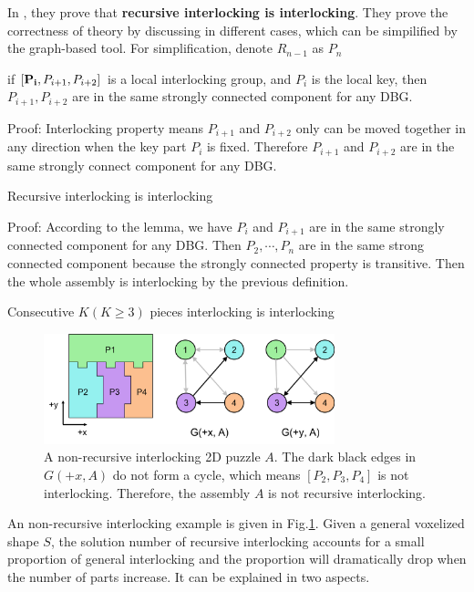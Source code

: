 In \cite{Song-2012-InterCubes}, they prove that {\bf recursive interlocking is interlocking}. They prove the correctness of theory by discussing in different cases, which can be simpilified by the graph-based tool. For simplification, denote $R_{n-1}$ as $P_n$
\noindent
\begin{lemma}
	if  $ [{\bf P_{i}}, P_{i+1}, P_{i+2}]$ is a local interlocking group, and $P_i$ is the local key, then $P_{i+1}, P_{i+2}$ are in the same strongly connected component for any DBG.
\end{lemma}
\noindent
Proof: Interlocking property means $P_{i+1}$ and $P_{i+2}$ only can be moved together in any direction when the key part $P_i$ is fixed. Therefore $P_{i+1}$ and $P_{i+2}$ are in the same strongly connect component for any DBG.

\begin{theorem}
	Recursive interlocking is interlocking
\end{theorem}
\noindent
Proof: According to the lemma, we have $P_i$ and $P_{i + 1}$ are in the same strongly connected component for any DBG. Then $P_2, \cdots, P_n$ are in the same strong connected component because the strongly connected property is transitive. Then the whole assembly is interlocking by the previous definition.

\begin{corollary}
	Consecutive $K(K \geq 3)$ pieces interlocking is interlocking
\end{corollary}

\begin{figure}[!t]
	\centering
	\includegraphics[width=8.45cm]{images/non-recursive_interlocking.png}
	\vspace*{-2.5mm}
	\caption{A non-recursive interlocking 2D puzzle $A$. The dark black edges in $G(+x, A)$ do not form a cycle, which means $[P_2, P_3, P_4]$ is not interlocking. Therefore, the assembly $A$ is not recursive interlocking.
	}
	\vspace*{-4.5mm}
	\label{fig:non-recursive interlocking}
\end{figure}

An non-recursive interlocking example is given in Fig.\ref{fig:non-recursive interlocking}. Given a general voxelized shape $S$, the solution number of recursive interlocking accounts for a small proportion of general interlocking and the proportion will dramatically drop when the number of parts increase. It can be explained in two aspects.

